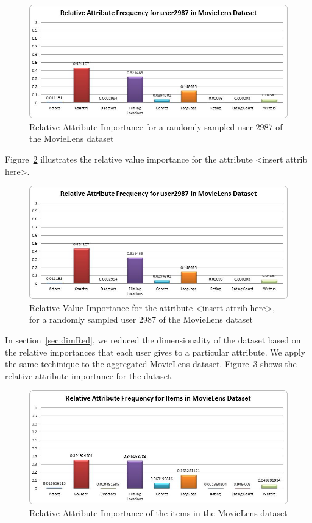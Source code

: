 \documentclass{acm_proc_article-sp}
\begin{document}
\begin{figure}[htp]
\centering
\includegraphics[scale=0.38]{Results/movielens_attrRelFreq_user2987.jpg}
\caption{Relative Attribute Importance for a randomly sampled user $2987$ of the MovieLens dataset}
\label{movielens_attrRelFreq_user}
\end{figure}

Figure~\ref{movielens_valRelFreq_user} illustrates the relative value importance for the attribute <insert attrib here>.

\begin{figure}[htp]
\centering
\includegraphics[scale=0.38]{Results/movielens_attrRelFreq_user2987.jpg}
\caption{Relative Value Importance for the attribute <insert attrib here>, for a randomly sampled user $2987$ of the MovieLens dataset}
\label{movielens_valRelFreq_user}
\end{figure}

In section~\ref{sec:dimRed}, we reduced the dimensionality of the dataset based on the relative importances that each user gives to a particular attribute. We apply the same techinique to the aggregated MovieLens dataset. Figure~\ref{movielens_attrRelFreq_item} shows the relative attribute importance for the dataset.

\begin{figure}[htp]
\centering
\includegraphics[scale=0.38]{Results/movielens_attrRelFreq_item.jpg}
\caption{Relative Attribute Importance of the items in the MovieLens dataset}
\label{movielens_attrRelFreq_item}
\end{figure}
\end{document}
